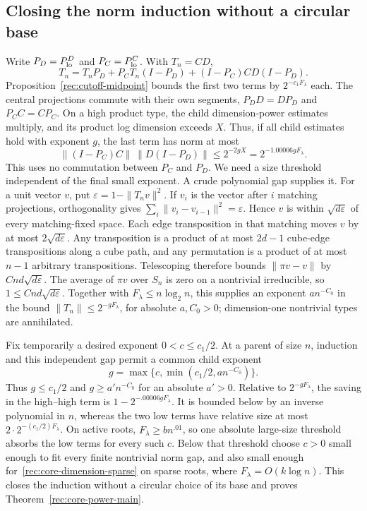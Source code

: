 \subsection{Closing the norm induction without a circular base}

Write $P_D=P_{\rm lo}^D$ and $P_C=P_{\rm lo}^C$.  With $T_n=CD$,
\[
 T_n=T_nP_D+P_CT_n(I-P_D)+(I-P_C)CD(I-P_D).
\]
Proposition~\ref{rec:cutoff-midpoint} bounds the first two terms by
$2^{-c_1F_\lambda}$ each.  The central projections commute with their
own segments, $P_DD=DP_D$ and $P_CC=CP_C$.  On a high product type,
the child dimension-power estimates multiply, and its product log
dimension exceeds $X$.  Thus, if all child estimates hold with exponent
$g$, the last term has norm at most
\[
 \|(I-P_C)C\|\,\|D(I-P_D)\|
 \le2^{-2gX}=2^{-1.00006gF_\lambda}.
\]
This uses no commutation between $P_C$ and $P_D$.
We need a size threshold independent of the final small exponent.
A crude polynomial gap supplies it.  For a unit vector $v$, put
$\varepsilon=1-\|T_nv\|^2$.  If $v_i$ is the vector after $i$
matching projections, orthogonality gives
$\sum_i\|v_i-v_{i-1}\|^2=\varepsilon$.
Hence $v$ is within $\sqrt{d\varepsilon}$ of every matching-fixed
space.  Each edge transposition in that matching moves $v$ by at most
$2\sqrt{d\varepsilon}$.  Any transposition is a product of at most
$2d-1$ cube-edge transpositions along a cube path, and any permutation
is a product of at most $n-1$ arbitrary transpositions.  Telescoping
therefore bounds $\|\pi v-v\|$ by $Cnd\sqrt{d\varepsilon}$.
The average of $\pi v$ over $S_n$ is zero on a nontrivial irreducible,
so $1\le Cnd\sqrt{d\varepsilon}$.
Together with $F_\lambda\le n\log_2n$, this supplies an exponent
$a n^{-C_0}$ in the bound $\|T_n\|\le2^{-gF_\lambda}$,
for absolute $a,C_0>0$; dimension-one nontrivial types are annihilated.

Fix temporarily a desired exponent $0<c\le c_1/2$.  At a parent of
size $n$, induction and this independent gap permit a common child
exponent
\[
 g=\max\{c,\min(c_1/2,a n^{-C_0})\}.
\]
Thus $g\le c_1/2$ and $g\ge a'n^{-C_0}$ for an absolute $a'>0$.
Relative to $2^{-gF_\lambda}$, the saving in the high--high term is
$1-2^{-.00006gF_\lambda}$.  It is bounded below by an inverse
polynomial in $n$, whereas the two low terms have relative size at most
$2\cdot2^{-(c_1/2)F_\lambda}$.  On active roots,
$F_\lambda\ge b n^{.01}$, so one absolute large-size threshold
absorbs the low terms for every such $c$.  Below that threshold choose
$c>0$ small enough to fit every finite nontrivial norm gap, and also
small enough for~\eqref{rec:core-dimension-sparse} on sparse roots,
where $F_\lambda=O(k\log n)$.  This closes the induction without
a circular choice of its base and proves
Theorem~\ref{rec:core-power-main}.

